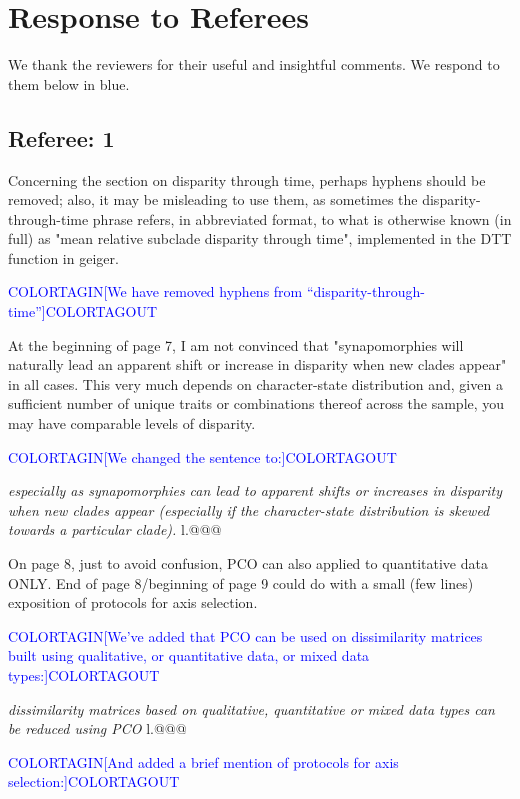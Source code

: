 \documentclass[12pt,letterpaper]{article}
\begin{document}
\section{Response to Referees}

We thank the reviewers for their useful and insightful comments. We respond to them below in blue.

\subsection{Referee: 1}
\noindent Concerning the section on disparity through time, perhaps hyphens should be removed; also, it may be misleading to use them, as sometimes the disparity-through-time phrase refers, in abbreviated format, to what is otherwise known (in full) as "mean relative subclade disparity through time", implemented in the DTT function in geiger.

\textcolor{blue}{COLORTAGIN[We have removed hyphens from ``disparity-through-time'']COLORTAGOUT}

\noindent At the beginning of page 7, I am not convinced that "synapomorphies will naturally lead an apparent shift or increase in disparity when new clades appear" in all cases. This very much depends on character-state distribution and, given a sufficient number of unique traits or combinations thereof across the sample, you may have comparable levels of disparity.

\textcolor{blue}{COLORTAGIN[We changed the sentence to:]COLORTAGOUT}

\textit{especially as synapomorphies can lead to apparent shifts or increases in disparity when new clades appear (especially if the character-state distribution is skewed towards a particular clade).} l.@@@

\noindent On page 8, just to avoid confusion, PCO can also applied to quantitative data ONLY. End of page 8/beginning of page 9 could do with a small (few lines) exposition of protocols for axis selection.

\textcolor{blue}{COLORTAGIN[We've added that PCO can be used on dissimilarity matrices built using qualitative, or quantitative data, or mixed data types:]COLORTAGOUT}

\textit{dissimilarity matrices based on qualitative, quantitative or mixed data types can be reduced using PCO} l.@@@

\textcolor{blue}{COLORTAGIN[And added a brief mention of protocols for axis selection:]COLORTAGOUT}
\end{document}
